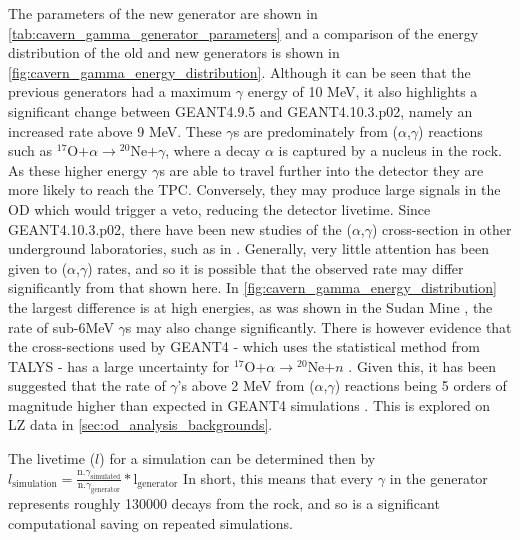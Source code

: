 \par
The parameters of the new generator are shown in \autoref{tab:cavern_gamma_generator_parameters} and a comparison of the energy distribution of the old and new generators is shown in \autoref{fig:cavern_gamma_energy_distribution}.
Although it can be seen that the previous generators had a maximum $\gamma$ energy of 10 MeV, it also highlights a significant change between GEANT4.9.5 and GEANT4.10.3.p02, namely an increased rate above 9 MeV.
These $\gamma$s are predominately from ($\alpha$,$\gamma$) reactions such as ${}^{17}$O$ + \alpha \to {}^{20}$Ne$ + \gamma$, where a decay $\alpha$ is captured by a nucleus in the rock.
As these higher energy $\gamma$s are able to travel further into the detector they are more likely to reach the TPC.
Conversely, they may produce large signals in the OD which would trigger a veto, reducing the detector livetime.
Since GEANT4.10.3.p02, there have been new studies of the ($\alpha$,$\gamma$) cross-section in other underground laboratories, such as in \cite{cavern_gammas_in_Soudan_mine_ref}.
Generally, very little attention has been given to ($\alpha$,$\gamma$) rates, and so it is possible that the observed rate may differ significantly from that shown here. 
In \autoref{fig:cavern_gamma_energy_distribution} the largest difference is at high energies, as was shown in the Sudan Mine \cite{cavern_gammas_in_Soudan_mine_ref}, the rate of sub-6MeV $\gamma$s may also change significantly. 
There is however evidence that the cross-sections used by GEANT4 - which uses the statistical method from TALYS \cite{talys_ref} - has a large uncertainty for ${}^{17}$O$ + \alpha \to {}^{20}$Ne$ + n$ \cite{alpha_gamma_statistical_error_ref}.
Given this, it has been suggested that the rate of $\gamma$'s above 2 MeV from ($\alpha$,$\gamma$) reactions being 5 orders of magnitude higher than expected in GEANT4 simulations \cite{soudanmine_counter_point_ref, alpha_gamma_reactions_ref}.
This is explored on LZ data in \autoref{sec:od_analysis_backgrounds}.

\par
The livetime ($l$) for a simulation can be determined then by $l_{\text{simulation}} = \frac{\text{n.} \gamma_{\text{simulated}}}{\text{n.} \gamma_{\text{generator}}} * \text{l}_{\text{generator}}$
In short, this means that every $\gamma$ in the generator represents roughly 130000 decays from the rock, and so is a significant computational saving on repeated simulations.


